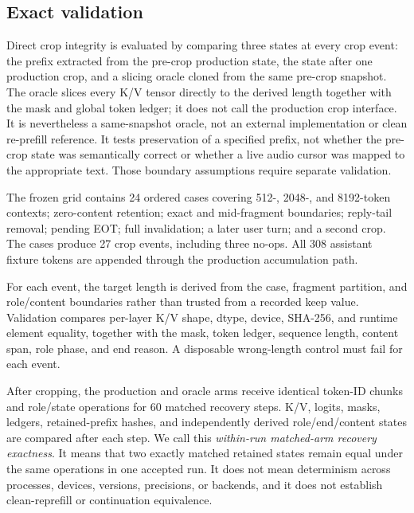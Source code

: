 \subsection{Exact validation}

Direct crop integrity is evaluated by comparing three states at every crop event: the prefix extracted from the pre-crop production state, the state after one production crop, and a slicing oracle cloned from the same pre-crop snapshot. The oracle slices every K/V tensor directly to the derived length together with the mask and global token ledger; it does not call the production crop interface. It is nevertheless a same-snapshot oracle, not an external implementation or clean re-prefill reference. It tests preservation of a specified prefix, not whether the pre-crop state was semantically correct or whether a live audio cursor was mapped to the appropriate text. Those boundary assumptions require separate validation.

The frozen grid contains 24 ordered cases covering 512-, 2048-, and 8192-token contexts; zero-content retention; exact and mid-fragment boundaries; reply-tail removal; pending EOT; full invalidation; a later user turn; and a second crop. The cases produce 27 crop events, including three no-ops. All 308 assistant fixture tokens are appended through the production accumulation path.

For each event, the target length is derived from the case, fragment partition, and role/content boundaries rather than trusted from a recorded keep value. Validation compares per-layer K/V shape, dtype, device, SHA-256, and runtime element equality, together with the mask, token ledger, sequence length, content span, role phase, and end reason. A disposable wrong-length control must fail for each event.

After cropping, the production and oracle arms receive identical token-ID chunks and role/state operations for 60 matched recovery steps. K/V, logits, masks, ledgers, retained-prefix hashes, and independently derived role/end/content states are compared after each step. We call this \emph{within-run matched-arm recovery exactness}. It means that two exactly matched retained states remain equal under the same operations in one accepted run. It does not mean determinism across processes, devices, versions, precisions, or backends, and it does not establish clean-reprefill or continuation equivalence.

